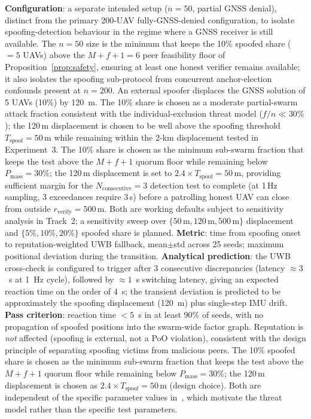\documentclass[conference,10pt]{IEEEtran}
\begin{document}
\textbf{Configuration}: a separate intended setup ($n=50$, partial GNSS denial), distinct from the primary 200-UAV fully-GNSS-denied configuration, to isolate spoofing-detection behaviour in the regime where a GNSS receiver is still available. The $n=50$ size is the minimum that keeps the 10\% spoofed share ($=5$ UAVs) above the $M+f+1=6$ peer feasibility floor of Proposition~\ref{prop:safety}, ensuring at least one honest verifier remains available; it also isolates the spoofing sub-protocol from concurrent anchor-election confounds present at $n=200$. An external spoofer displaces the GNSS solution of 5 UAVs (10\%) by 120~m. The 10\% share is chosen as a moderate partial-swarm attack fraction consistent with the individual-exclusion threat model ($f/n \ll 30\%$); the 120\,m displacement is chosen to be well above the spoofing threshold $T_\text{spoof}=50$\,m while remaining within the 2-km displacement tested in Experiment~3. The 10\% share is chosen as the minimum sub-swarm fraction that keeps the test above the $M+f+1$ quorum floor while remaining below $P_\text{mass}=30\%$; the 120\,m displacement is set to $2.4\times T_\text{spoof}=50$\,m, providing sufficient margin for the $N_\text{consecutive}=3$ detection test to complete (at 1\,Hz sampling, 3 exceedances require 3\,s) before a patrolling honest UAV can close from outside $r_\text{verify}=500$\,m. Both are working defaults subject to sensitivity analysis in Track~2; a sensitivity sweep over $\{50\,\text{m}, 120\,\text{m}, 500\,\text{m}\}$ displacement and $\{5\%, 10\%, 20\%\}$ spoofed share is planned.
\textbf{Metric}: time from spoofing onset to reputation-weighted UWB fallback, mean$\pm$std across 25 seeds; maximum positional deviation during the transition.
\textbf{Analytical prediction}: the UWB cross-check is configured to trigger after 3 consecutive discrepancies (latency $\approx 3$~s at 1~Hz cycle), followed by $\approx 1$~s switching latency, giving an expected reaction time on the order of 4~s; the transient deviation is predicted to be approximately the spoofing displacement (120~m) plus single-step IMU drift.
\textbf{Pass criterion}: reaction time $<5$~s in at least 90\% of seeds, with no propagation of spoofed positions into the swarm-wide factor graph. Reputation is \emph{not} affected (spoofing is external, not a PoO violation), consistent with the design principle of separating spoofing victims from malicious peers. The 10\% spoofed share is chosen as the minimum sub-swarm fraction that keeps the test above the $M+f+1$ quorum floor while remaining below $P_\text{mass}=30\%$; the 120\,m displacement is chosen as $2.4\times T_\text{spoof}=50$\,m (design choice). Both are independent of the specific parameter values in~\cite{mykytyn2023gpsspoofing,bi2024spoofing}, which motivate the threat model rather than the specific test parameters.
\end{document}
